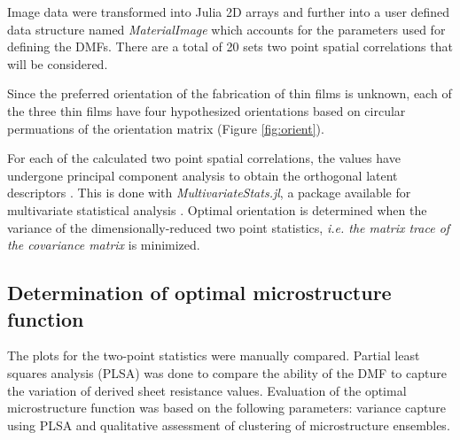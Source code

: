 Image data were transformed into Julia 2D arrays \cite{julia15} and further into a user defined data structure named \emph{MaterialImage} which accounts for the parameters used for defining the DMFs.
There are a total of 20 sets two point spatial correlations that will be considered.

Since the preferred orientation of the fabrication of thin films is unknown, each of the three thin films have four hypothesized orientations based on circular permuations of the orientation matrix (Figure \ref{fig:orient}).

For each of the calculated two point spatial correlations, the values have undergone principal component analysis to obtain the orthogonal latent descriptors \cite{gupta15, sun17}.
This is done with \emph{MultivariateStats.jl}, a package available for multivariate statistical analysis \cite{mvstats}.
Optimal orientation is determined when the variance of the dimensionally-reduced two point statistics, \textit{i.e. the matrix trace of the covariance matrix} is minimized.

\subsection{Determination of optimal microstructure function}
The plots for the two-point statistics were manually compared.
Partial least squares analysis (PLSA) was done to compare the ability of the DMF to capture the variation of derived sheet resistance values.
Evaluation of the optimal microstructure function was based on the following parameters: variance capture using PLSA and qualitative assessment of clustering of microstructure ensembles.
